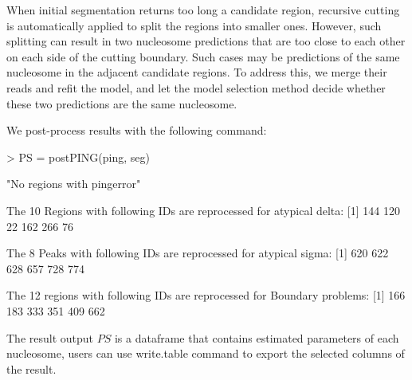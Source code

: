 \documentclass[11pt]{article}
\begin{document}
When initial segmentation returns too long a candidate region, recursive cutting is automatically applied to split the regions into smaller ones. However, such splitting can result in two nucleosome predictions that are too close to each other on each side of the cutting boundary. Such cases may be predictions of the same nucleosome in the adjacent candidate regions. To address this, we merge their reads and refit the model, and let the model selection method decide whether these two predictions are the same nucleosome.

We post-process results with the following command:


\begin{Schunk}
\begin{Sinput}
> PS = postPING(ping, seg)
\end{Sinput}
\begin{Soutput}
[1] "No regions with pingerror"

 The 10 Regions with following IDs are reprocessed for atypical delta: 
[1] 144 120  22 162 266  76

 The 8 Peaks with following IDs are reprocessed for atypical sigma: 
[1] 620 622 628 657 728 774

 The 12 regions with following IDs are reprocessed for Boundary problems: 
[1] 166 183 333 351 409 662
\end{Soutput}
\end{Schunk}
The result output $PS$ is a dataframe that contains estimated parameters of each nucleosome, users can use write.table command to export the selected columns of the result.
\end{document}
